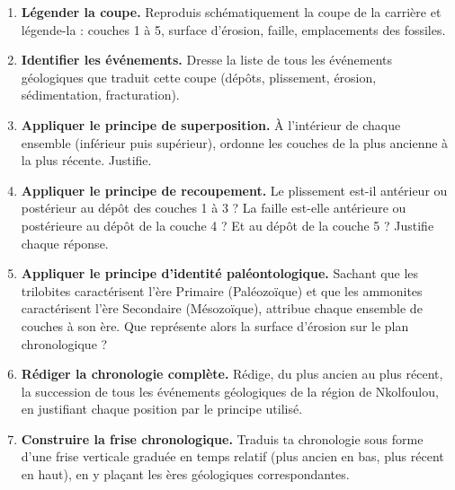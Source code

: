 \documentclass[11pt]{article}
\newcommand{\cle}[1]{{\popxbold\color{popdark}#1}}
\newcounter{popsec}
\newcounter{popsub}
\newcommand{\courssub}[1]{%
  \stepcounter{popsub}%
  \par\vspace{9pt}\noindent{\popxbold\fontsize{11.5}{13}\selectfont\color{popink}{\color{poporange}\thepopsec.\thepopsub}\hspace{6pt}#1}\par\nopagebreak\vspace{4pt}
}
\begin{document}
\begin{enumerate}
\item \textbf{Légender la coupe.} Reproduis schématiquement la coupe de la carrière et légende-la : couches 1 à 5, surface d'érosion, faille, emplacements des fossiles.
\item \textbf{Identifier les événements.} Dresse la liste de tous les événements géologiques que traduit cette coupe (dépôts, plissement, érosion, sédimentation, fracturation).
\item \textbf{Appliquer le principe de superposition.} À l'intérieur de chaque ensemble (inférieur puis supérieur), ordonne les couches de la plus ancienne à la plus récente. Justifie.
\item \textbf{Appliquer le principe de recoupement.} Le plissement est-il antérieur ou postérieur au dépôt des couches 1 à 3 ? La faille est-elle antérieure ou postérieure au dépôt de la couche 4 ? Et au dépôt de la couche 5 ? Justifie chaque réponse.
\item \textbf{Appliquer le principe d'identité paléontologique.} Sachant que les trilobites caractérisent l'\cle{ère Primaire} (Paléozoïque) et que les ammonites caractérisent l'\cle{ère Secondaire} (Mésozoïque), attribue chaque ensemble de couches à son ère. Que représente alors la surface d'érosion sur le plan chronologique ?
\item \textbf{Rédiger la chronologie complète.} Rédige, du plus ancien au plus récent, la succession de tous les événements géologiques de la région de Nkolfoulou, en justifiant chaque position par le principe utilisé.
\item \textbf{Construire la frise chronologique.} Traduis ta chronologie sous forme d'une frise verticale graduée en temps relatif (plus ancien en bas, plus récent en haut), en y plaçant les ères géologiques correspondantes.
\end{enumerate}

\courssub{Ressources à mobiliser}
\end{document}
